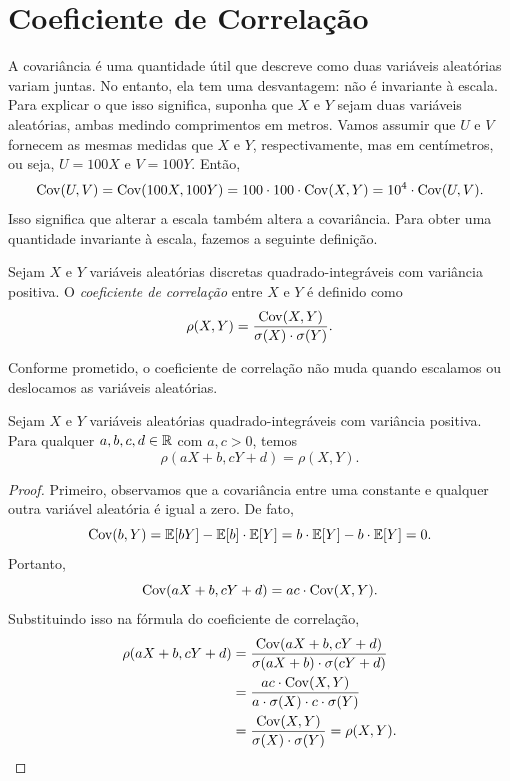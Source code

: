 


\clearpage
\section{Coeficiente de Correlação}

A covariância é uma quantidade útil que descreve como duas variáveis aleatórias variam juntas. No entanto, ela tem uma desvantagem: não é invariante à escala. Para explicar o que isso significa, suponha que $X$ e $Y$ sejam duas variáveis aleatórias, ambas medindo comprimentos em metros. Vamos assumir que $U$ e $V$ fornecem as mesmas medidas que $X$ e $Y$, respectivamente, mas em centímetros, ou seja, $U = 100X$ e $V = 100Y$. Então,
\[\mathrm{Cov}(U, V) = \mathrm{Cov}(100X, 100Y) = 100 \cdot 100 \cdot \mathrm{Cov}(X, Y) = 10^4 \cdot \mathrm{Cov}(U, V).\]
Isso significa que alterar a escala também altera a covariância. Para obter uma quantidade invariante à escala, fazemos a seguinte definição.

\begin{definition*}
Sejam $X$ e $Y$ variáveis aleatórias discretas quadrado-integráveis com variância positiva. O \emph{coeficiente de correlação} entre $X$ e $Y$ é definido como
\[
\rho(X, Y) = \frac{\mathrm{Cov}(X, Y)}{\sigma(X) \cdot \sigma(Y)}
.
\]
\end{definition*}

Conforme prometido, o coeficiente de correlação não muda quando escalamos ou deslocamos as variáveis aleatórias.

\begin{proposition*}
Sejam $X$ e $Y$ variáveis aleatórias quadrado-integráveis com variância positiva. Para qualquer $a, b, c, d \in \mathbb{R}$ com $a, c > 0$, temos
\[
\rho(aX + b, cY + d) = \rho(X, Y)
.
\]
\end{proposition*}
\begin{proof}
Primeiro, observamos que a covariância entre uma constante e qualquer outra variável aleatória é igual a zero. De fato,
\[
\mathrm{Cov}(b, Y) = \mathbb{E}[bY] - \mathbb{E}[b] \cdot \mathbb{E}[Y] = b \cdot \mathbb{E}[Y] - b \cdot \mathbb{E}[Y] = 0
.
\]
Portanto,
\[\mathrm{Cov}(aX + b, cY + d) = ac \cdot \mathrm{Cov}(X, Y).\]
Substituindo isso na fórmula do coeficiente de correlação,
\begin{align*}
\rho(aX + b, cY + d)
&=
\frac{\mathrm{Cov}(aX + b, cY + d)}{{\sigma(aX + b) \cdot \sigma(cY + d)}}
\\
&=
\frac{ac \cdot \mathrm{Cov}(X, Y)}{{a \cdot \sigma(X) \cdot c \cdot \sigma(Y)}}
\\
&=
\frac{\mathrm{Cov}(X, Y)}{{\sigma(X) \cdot \sigma(Y)}}
= \rho(X, Y)
.
\qedhere
\end{align*}
\end{proof}

